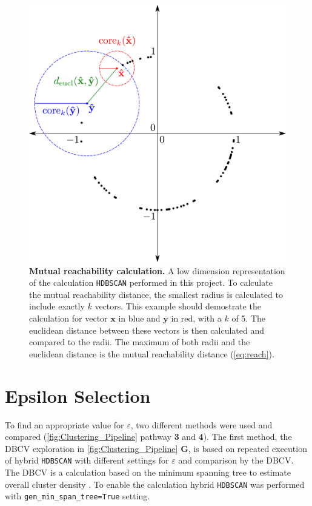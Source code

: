 \begin{figure}[!hbt]
    \centering
    \includegraphics[width=\textwidth]{Graphics/HDB.pdf}
    \caption[Mutual reachability calculation]{\textbf{Mutual reachability calculation.} A low dimension representation of the calculation \texttt{HDBSCAN} performed in this project. To calculate the mutual reachability distance, the smallest radius is calculated to include exactly $k$ vectors. This example should demostrate the calculation for vector $\mathbf{x}$ in blue and $\mathbf{y}$ in red, with a $k$ of 5. The euclidean distance between these vectors is then calculated and compared to the radii. The maximum of both radii and the euclidean distance is the mutual reachability distance (\autoref{eq:reach}).}
    \label{fig:HDB}
\end{figure}

\section{Epsilon Selection} \label{sec:epsilon}

To find an appropriate value for $\varepsilon$, two different methods were used and compared (\autoref{fig:Clustering_Pipeline} pathway \textsf{\textbf{3}} and \textsf{\textbf{4}}). The first method, the \gls{DBCV} exploration in \autoref{fig:Clustering_Pipeline} \textsf{\textbf{G}}, is based on repeated execution of hybrid \texttt{HDBSCAN} with different settings for $\varepsilon$ and comparison by the \gls{DBCV}. The \gls{DBCV} is a calculation based on the minimum spanning tree to estimate overall cluster density \autocite{moulavi_density-based_2014}. To enable the calculation hybrid \texttt{HDBSCAN} was performed with \texttt{gen\_min\_span\_tree=True} setting.

